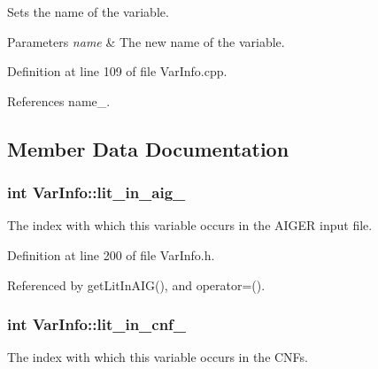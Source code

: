 Sets the name of the variable. 


\begin{DoxyParams}{Parameters}
{\em name} & The new name of the variable. \\
\hline
\end{DoxyParams}


Definition at line 109 of file Var\-Info.\-cpp.



References name\-\_\-.



\subsection{Member Data Documentation}
\hypertarget{classVarInfo_ae0bf3d35787614131a642bea83d30555}{
\subsubsection[{lit\-\_\-in\-\_\-aig\-\_\-}]{\setlength{\rightskip}{0pt plus 5cm}int Var\-Info\-::lit\-\_\-in\-\_\-aig\-\_\-\hspace{0.3cm}{\ttfamily [protected]}}}\label{classVarInfo_ae0bf3d35787614131a642bea83d30555}


The index with which this variable occurs in the A\-I\-G\-E\-R input file. 



Definition at line 200 of file Var\-Info.\-h.



Referenced by get\-Lit\-In\-A\-I\-G(), and operator=().

\hypertarget{classVarInfo_aa9937f8bae554d520b194c4d97df4b64}{
\subsubsection[{lit\-\_\-in\-\_\-cnf\-\_\-}]{\setlength{\rightskip}{0pt plus 5cm}int Var\-Info\-::lit\-\_\-in\-\_\-cnf\-\_\-\hspace{0.3cm}{\ttfamily [protected]}}}\label{classVarInfo_aa9937f8bae554d520b194c4d97df4b64}


The index with which this variable occurs in the C\-N\-Fs. 



